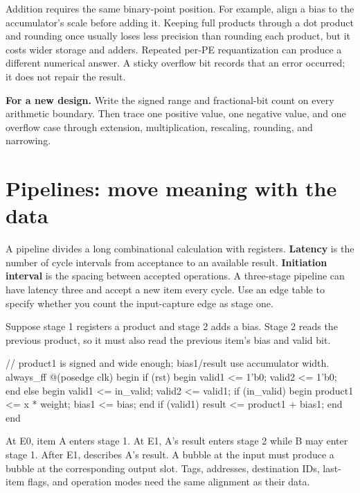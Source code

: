 \documentclass[11pt]{article}
\newcommand{\cd}[1]{{\frenchspacing\texttt{\detokenize{#1}}}}
\newcommand{\transfer}[1]{\par\textbf{For a new design.} #1\par}
\begin{document}
Addition requires the same binary-point position. For example, align a bias to the accumulator's scale before adding it.
Keeping full products through a dot product and rounding once usually loses less precision than rounding each product,
but it costs wider storage and adders. Repeated per-PE requantization can produce a different numerical answer.
A sticky overflow bit records that an error occurred; it does not repair the result.
\transfer{Write the signed range and fractional-bit count on every arithmetic boundary.
Then trace one positive value, one negative value, and one overflow case through extension, multiplication, rescaling, rounding, and narrowing.}

\section{Pipelines: move meaning with the data}\label{sec:pipeline}
A pipeline divides a long combinational calculation with registers.
\textbf{Latency} is the number of cycle intervals from acceptance to an available result.
\textbf{Initiation interval} is the spacing between accepted operations. A three-stage pipeline can have latency three and accept a new item every cycle.
Use an edge table to specify whether you count the input-capture edge as stage one.

Suppose stage 1 registers a product and stage 2 adds a bias. Stage 2 reads the previous product, so it must also read the previous item's bias and valid bit.
\par\noindent\begin{minipage}{\linewidth}
\begin{svcode}
// product1 is signed and wide enough; bias1/result use accumulator width.
always_ff @(posedge clk) begin
    if (rst) begin
        valid1 <= 1'b0;
        valid2 <= 1'b0;
    end else begin
        valid1 <= in_valid;
        valid2 <= valid1;
        if (in_valid) begin
            product1 <= x * weight;
            bias1 <= bias;
        end
        if (valid1)
            result <= product1 + bias1;
    end
end
\end{svcode}
\end{minipage}\par
At E0, item A enters stage 1. At E1, A's result enters stage 2 while B may enter stage 1.
After E1, \cd{valid2} describes A's result. A bubble at the input must produce a bubble at the corresponding output slot.
Tags, addresses, destination IDs, last-item flags, and operation modes need the same alignment as their data.
\end{document}
